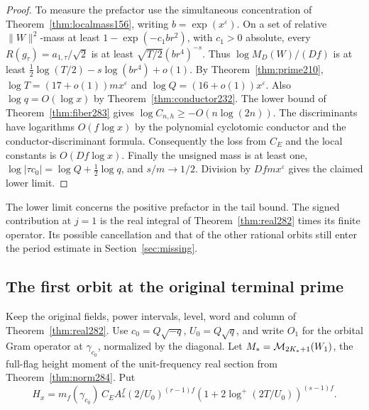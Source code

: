 \documentclass[a4paper,11pt]{article}
\theoremstyle{definition}
\theoremstyle{remark}
\numberwithin{equation}{section}
\begin{document}
\begin{proof}
To measure the prefactor use the simultaneous concentration
of Theorem~\ref{thm:localmass156}, writing \(b=\exp(x^\varepsilon)\).
On a set of relative \(\|W\|^2\)-mass at least
\(1-\exp(-c_1br^2)\), with \(c_1>0\) absolute, every
\(R(g_\tau)=a_{1,\tau}/\sqrt2\) is at least
\(\sqrt{T/2}(br^4)^{-s}\). Thus \(\log M_D(W)/(Df)\)
is at least
\(\tfrac12\log(T/2)-s\log(br^4)+o(1)\).
By Theorem~\ref{thm:prime210},
\(\log T=(17+o(1))m x^\varepsilon\) and
\(\log Q=(16+o(1))x^\varepsilon\). Also \(\log q=O(\log x)\)
by Theorem~\ref{thm:conductor232}. The lower bound of
Theorem~\ref{thm:fiber283} gives
\(\log C_{n,h}\ge-O(n\log(2n))\).
The discriminants have logarithms \(O(f\log x)\) by the
polynomial cyclotomic conductor and the conductor-discriminant
formula. Consequently the loss from \(C_E\) and the local
constants is \(O(Df\log x)\). Finally the unsigned mass is
at least one, \(\log|\tau c_0|=\log Q+\tfrac12\log q\),
and \(s/m\to1/2\). Division by \(Df m x^\varepsilon\)
gives the claimed lower limit.
\end{proof}

The lower limit concerns the positive prefactor in the tail
bound. The signed contribution at \(j=1\) is the real
integral of Theorem~\ref{thm:real282} times its finite
operator. Its possible cancellation and that of the other
rational orbits still enter the period estimate in Section~\ref{sec:missing}.

\subsection{The first orbit at the original terminal prime}\label{nav:IX-51}
Keep the original fields, power intervals, level, word
and column of Theorem~\ref{thm:real282}.
Use \(c_0=Q\sqrt{-q}\), \(U_0=Q\sqrt q\), and write \(O_1\)
for the orbital Gram operator at \(\gamma_{c_0}\), normalized
by the diagonal. Let \(M_*={\cal M}_{2K_*+1}(W_1)\), the
full-flag height moment of the unit-frequency real section
from Theorem~\ref{thm:norm284}. Put
\[
 H_x=m_f(\gamma_{c_0})\,C_E A_*^f
        (2/U_0)^{(r-1)f}
           (1+2\log^+(2T/U_0))^{(s-1)f}.
\]
\end{document}
